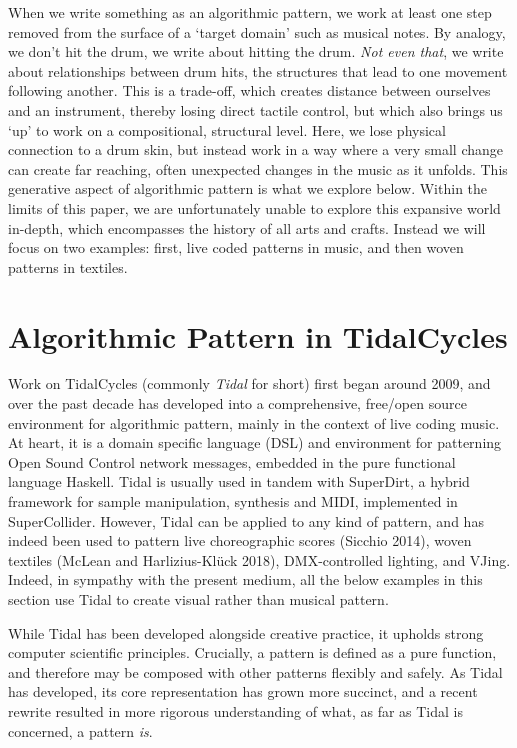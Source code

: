 \documentclass{nime-alternate} %
\begin{document}
When we write something as an algorithmic pattern, we work at least one
step removed from the surface of a `target domain' such as musical
notes. By analogy, we don't hit the drum, we write about hitting the
drum. \emph{Not even that}, we write about relationships between drum
hits, the structures that lead to one movement following another. This
is a trade-off, which creates distance between ourselves and an
instrument, thereby losing direct tactile control, but which also brings
us `up' to work on a compositional, structural level. Here, we lose
physical connection to a drum skin, but instead work in a way where a
very small change can create far reaching, often unexpected changes in
the music as it unfolds. This generative aspect of algorithmic pattern
is what we explore below. Within the limits of this paper, we are
unfortunately unable to explore this expansive world in-depth, which
encompasses the history of all arts and crafts. Instead we will focus on
two examples: first, live coded patterns in music, and then woven
patterns in textiles.

\hypertarget{algorithmic-pattern-in-tidalcycles}{%
\section{Algorithmic Pattern in
TidalCycles}\label{algorithmic-pattern-in-tidalcycles}}

Work on TidalCycles (commonly \emph{Tidal} for short) first began around
2009, and over the past decade has developed into a comprehensive,
free/open source environment for algorithmic pattern, mainly in the
context of live coding music. At heart, it is a domain specific language
(DSL) and environment for patterning Open Sound Control network
messages, embedded in the pure functional language Haskell. Tidal is
usually used in tandem with SuperDirt, a hybrid framework for sample
manipulation, synthesis and MIDI, implemented in SuperCollider. However,
Tidal can be applied to any kind of pattern, and has indeed been used to
pattern live choreographic scores (Sicchio 2014), woven textiles (McLean
and Harlizius-Klück 2018), DMX-controlled lighting, and VJing. Indeed,
in sympathy with the present medium, all the below examples in this
section use Tidal to create visual rather than musical pattern.

While Tidal has been developed alongside creative practice, it upholds
strong computer scientific principles. Crucially, a pattern is defined
as a pure function, and therefore may be composed with other patterns
flexibly and safely. As Tidal has developed, its core representation has
grown more succinct, and a recent rewrite resulted in more rigorous
understanding of what, as far as Tidal is concerned, a pattern
\emph{is}.
\end{document}
